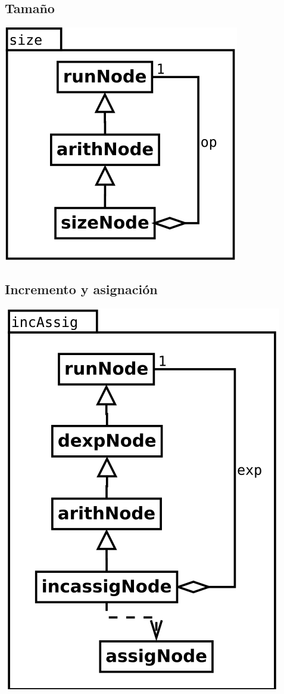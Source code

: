 \subsection {Tamaño}
\begin{center}
\includegraphics[scale=0.4]{size.png} \\
\end{center}




\subsection {Incremento y asignación}
\begin{center}
\includegraphics[scale=0.4]{incAssig.png} \\
\end{center}

